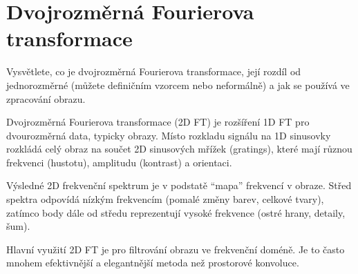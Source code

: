\section{Dvojrozměrná Fourierova transformace}
Vysvětlete, co je dvojrozměrná Fourierova transformace, její rozdíl od jednorozměrné (můžete definičním vzorcem 
nebo neformálně) a jak se používá ve zpracování obrazu.

Dvojrozměrná Fourierova transformace (2D FT) je rozšíření 1D FT pro dvourozměrná data, typicky obrazy. Místo rozkladu 
signálu na 1D sinusovky rozkládá celý obraz na součet 2D sinusových mřížek (gratings), které mají různou frekvenci 
(hustotu), amplitudu (kontrast) a orientaci. 

Výsledné 2D frekvenční spektrum je v podstatě \enquote{mapa} frekvencí v obraze. Střed spektra odpovídá nízkým 
frekvencím (pomalé změny barev, celkové tvary), zatímco body dále od středu reprezentují vysoké frekvence (ostré hrany, 
detaily, šum).

Hlavní využití 2D FT je pro filtrování obrazu ve frekvenční doméně. Je to často mnohem efektivnější a elegantnější 
metoda než prostorové konvoluce.